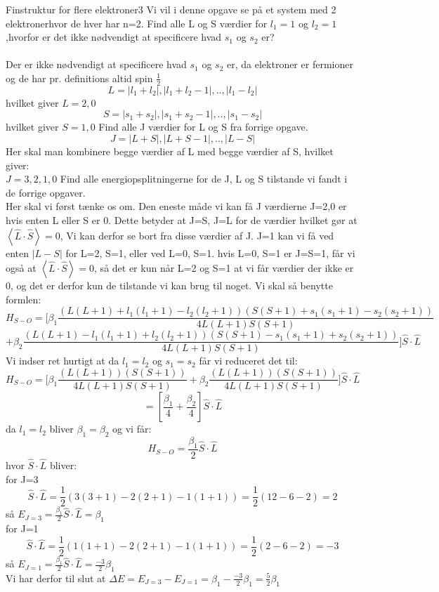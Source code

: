 \documentclass[../../../Atom-ogMolekylefysik.tex]{subfiles}
\begin{document}
\begin{opgave}{Finstruktur for flere elektroner}{3}
Vi vil i denne opgave se på et system med 2 elektronerhvor de hver har n=2.
\opg Find alle L og S værdier for $l_1=1$ og $l_2=1$,hvorfor er det ikke nødvendigt at specificere hvad $s_1$ og $s_2$ er?\\
\\
Der er ikke nødvendigt at specificere hvad $s_1$ og $s_2$ er, da elektroner er fermioner og de har pr. definitions altid spin $\frac{1}{2}$
$$L=|l_1+l_2|,|l_1+l_2-1|,..,|l_1-l_2|$$
hvilket giver $L=2,0$
$$S=|s_1+s_2|,|s_1+s_2-1|,..,|s_1-s_2|$$
hvilket giver $S=1,0$
\opg Find alle J værdier for L og S fra forrige opgave.
$$J=|L+S|,|L+S-1|,..,|L-S|$$
Her skal man kombinere begge værdier af L med begge værdier af S, hvilket giver:\\
$J=3,2,1,0$
\opg Find alle energiopsplitningerne for de J, L og S tilstande vi fandt i de forrige opgaver.\\
Her skal vi først tænke os om. Den eneste måde vi kan få J værdierne J=2,0 er hvis enten L eller S er 0. Dette betyder at J=S, J=L for de værdier hvilket gør at $\left<\hat{L}\cdot\hat{S}\right>=0$, Vi kan derfor se bort fra disse værdier af J.
J=1 kan vi få ved enten $|L-S|$ for L=2, S=1, eller ved L=0, S=1. hvis L=0, S=1 er J=S=1, får vi også at $\left<\hat{L}\cdot\hat{S}\right>=0$, så det er kun når L=2 og S=1 at vi får værdier der ikke er 0, og det er derfor kun de tilstande vi kan brug til noget. Vi skal så benytte formlen:
$$H_{S-O}=\Bigg[\beta_1\frac{(L(L+1)+l_1(l_1+1)-l_2(l_2+1))(S(S+1)+s_1(s_1+1)-s_2(s_2+1))}{4L(L+1)S(S+1)}$$
$$+\beta_2\frac{(L(L+1)-l_1(l_1+1)+l_2(l_2+1))(S(S+1)-s_1(s_1+1)+s_2(s_2+1))}{4L(L+1)S(S+1)}\Bigg]\hat{S}\cdot\hat{L}$$
Vi indser ret hurtigt at da $l_1=l_2$ og $s_1=s_2$ får vi reduceret det til:
$$H_{S-O}=\Bigg[\beta_1\frac{(L(L+1))(S(S+1))}{4L(L+1)S(S+1)}+\beta_2\frac{(L(L+1))(S(S+1))}{4L(L+1)S(S+1)}\Bigg]\hat{S}\cdot\hat{L}$$
$$=\left[\frac{\beta_1}{4}+\frac{\beta_2}{4}\right]\hat{S}\cdot\hat{L}$$
da $l_1=l_2$ bliver $\beta_1=\beta_2$ og vi får:
$$H_{S-O}=\frac{\beta_1}{2}\hat{S}\cdot\hat{L}$$
hvor $\hat{S}\cdot\hat{L}$ bliver:\\
for J=3
$$\hat{S}\cdot\hat{L}=\frac{1}{2}(3(3+1)-2(2+1)-1(1+1))=\frac{1}{2}(12-6-2)=2$$
så $E_{J=3}=\frac{\beta_1}{2}\hat{S}\cdot\hat{L}=\beta_1$\\
for J=1
$$\hat{S}\cdot\hat{L}=\frac{1}{2}(1(1+1)-2(2+1)-1(1+1))=\frac{1}{2}(2-6-2)=-3$$
så $E_{J=1}=\frac{\beta_1}{2}\hat{S}\cdot\hat{L}=\frac{-3}{2}\beta_1$\\
Vi har derfor til slut at $\Delta E=E_{J=3}-E_{J=1}=\beta_1-\frac{-3}{2}\beta_1=\frac{5}{2}\beta_1$
\end{opgave}
\end{document}
